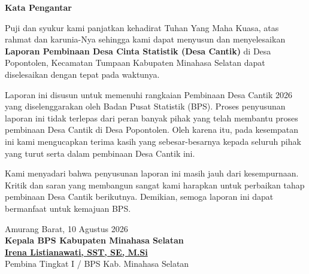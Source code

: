 
\begin{center}
  {\Large \textbf{Kata Pengantar}}
\end{center}
\vspace*{0.6cm}

Puji dan syukur kami panjatkan kehadirat Tuhan Yang Maha Kuasa, atas rahmat dan karunia-Nya sehingga kami dapat menyusun dan menyelesaikan \textbf{Laporan Pembinaan Desa Cinta Statistik (Desa Cantik)} di Desa Popontolen, Kecamatan Tumpaan Kabupaten Minahasa Selatan dapat diselesaikan dengan tepat pada waktunya.

Laporan ini disusun untuk memenuhi rangkaian Pembinaan Desa Cantik 2026 yang diselenggarakan oleh Badan Pusat Statistik (BPS). Proses penyusunan laporan ini tidak terlepas dari peran banyak pihak yang telah membantu proses pembinaan Desa Cantik di Desa Popontolen. Oleh karena itu, pada kesempatan ini kami mengucapkan terima kasih yang sebesar-besarnya kepada seluruh pihak yang turut serta dalam pembinaan Desa Cantik ini.

Kami menyadari bahwa penyusunan laporan ini masih jauh dari kesempurnaan. Kritik dan saran yang membangun sangat kami harapkan untuk perbaikan tahap pembinaan Desa Cantik berikutnya. Demikian, semoga laporan ini dapat bermanfaat untuk kemajuan BPS.

\vspace*{1.5cm}
\begin{flushright}
  \begin{minipage}{0.55\textwidth}
    \centering
    Amurang Barat, 10 Agustus 2026\\[0.1cm]
    \textbf{Kepala BPS Kabupaten Minahasa Selatan}\\[2.5cm]
    \textbf{\underline{Irena Listianawati, SST, SE, M.Si}}\\[0.1cm]
    Pembina Tingkat I / BPS Kab. Minahasa Selatan
  \end{minipage}
\end{flushright}
